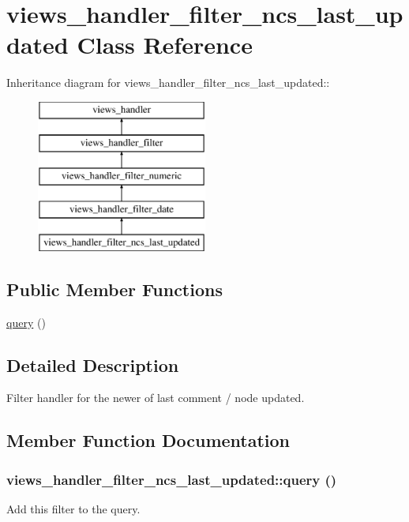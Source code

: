 \hypertarget{classviews__handler__filter__ncs__last__updated}{
\section{views\_\-handler\_\-filter\_\-ncs\_\-last\_\-updated Class Reference}
\label{classviews__handler__filter__ncs__last__updated}
}
Inheritance diagram for views\_\-handler\_\-filter\_\-ncs\_\-last\_\-updated::\begin{figure}[H]
\begin{center}
\leavevmode
\includegraphics[height=5cm]{classviews__handler__filter__ncs__last__updated}
\end{center}
\end{figure}
\subsection*{Public Member Functions}
\begin{DoxyCompactItemize}
\item 
\hyperlink{classviews__handler__filter__ncs__last__updated_afdcfcb18506212eb4b5df8b19971ff48}{query} ()
\end{DoxyCompactItemize}


\subsection{Detailed Description}
Filter handler for the newer of last comment / node updated. 

\subsection{Member Function Documentation}
\hypertarget{classviews__handler__filter__ncs__last__updated_afdcfcb18506212eb4b5df8b19971ff48}{
\subsubsection[{query}]{\setlength{\rightskip}{0pt plus 5cm}views\_\-handler\_\-filter\_\-ncs\_\-last\_\-updated::query ()}}
\label{classviews__handler__filter__ncs__last__updated_afdcfcb18506212eb4b5df8b19971ff48}
Add this filter to the query.

